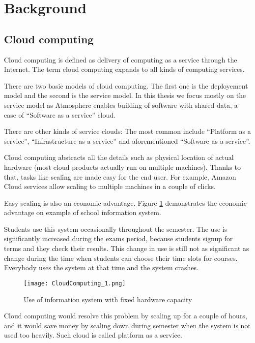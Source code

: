 \section{Background}

\subsection{Cloud computing}

Cloud computing is defined as delivery of computing as a service through the Internet. The term cloud computing expands to all kinds of computing services.

There are two basic models of cloud computing. The first one is the deployement model and the second is the service model. In this thesis we focus mostly on the service model as Atmosphere enables building of software with shared data, a case of ``Software as a service'' cloud. 

There are other kinds of service clouds: The most common include ``Platform as a service'', ``Infrastructure as a service'' and aforementioned ``Software as a service''.

Cloud computing abstracts all the details such as physical location of actual hardware (most cloud products actually run on multiple machines). Thanks to that, tasks like scaling are made easy for the end user. For example, Amazon Cloud services allow scaling to multiple machines in a couple of clicks.

Easy scaling is also an economic advantage. Figure \ref{fig:1} demonstrates the economic advantage on example of school information system.

Students use this system occasionally throughout the semester. The use is significantly increased during the exams period, because students signup for terms and they check their results. This change in use is still not as significant as change during the time when students can choose their time slots for courses. Everybody uses the system at that time and the system crashes.

\begin{figure}[ht!]
\centering
\texttt{[image: CloudComputing\_1.png]}
\caption{Use of information system with fixed hardware capacity \label{fig:1}}
\end{figure}

Cloud computing would resolve this problem by scaling up for a couple of hours, and it would save money by scaling down during semester when the system is not used too heavily. Such cloud is called platform as a service.

